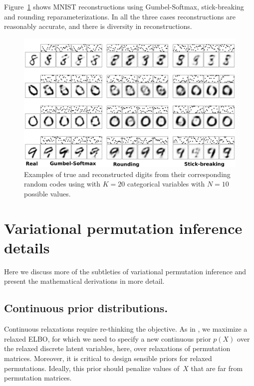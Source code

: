 \documentclass[twoside]{article}
\begin{document}

Figure~\ref{fig:VAE} shows MNIST reconstructions using Gumbel-Softmax,
stick-breaking and rounding reparameterizations. In all the three
cases reconstructions are reasonably accurate, and there is diversity
in reconstructions.
\begin{figure}[t]
  \centering
  \includegraphics[width=5.in]{../figures/figure4.pdf} 
  \caption{Examples of true and reconstructed digits from their corresponding random codes using with $K=20$ categorical variables with $N=10$ possible values.
  }
\label{fig:VAE}
\end{figure}


\section{Variational permutation inference details}

Here we discuss more of the subtleties of variational permutation
inference and present the mathematical derivations in more detail. 

\subsection{Continuous prior distributions.} 
Continuous relaxations require re-thinking the objective. As in
\cite{maddison2016concrete}, we maximize a relaxed ELBO, for which we
need to specify a new continuous prior $p(X)$ over the relaxed
discrete latent variables, here, over relaxations of permutation
matrices. Moreover, it is critical to design sensible priors for
relaxed permutations.  Ideally, this prior should penalize values
of~$X$ that are far from permutation matrices.
\end{document}

